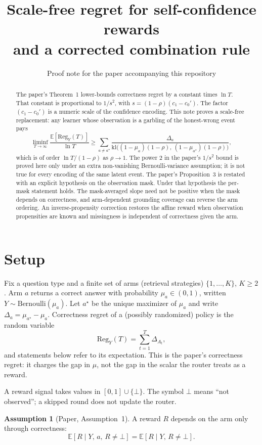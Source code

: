 \documentclass{article}
\title{Scale-free regret for self-confidence rewards\\
and a corrected combination rule}
\author{Proof note for the paper accompanying this repository}
\date{}
\theoremstyle{definition}
\newtheorem{assumption}[theorem]{Assumption}
\theoremstyle{remark}
\newcommand{\E}{\mathbb{E}}
\newcommand{\kl}{\mathrm{kl}}
\newcommand{\Reg}{\mathrm{Reg}}
\begin{document}
\maketitle

\begin{abstract}
The paper's Theorem~1 lower-bounds correctness regret by a constant times $\ln T$. That constant is proportional to $1/s^2$, with $s=(1-\rho)(c_1-c_0')$. The factor $(c_1-c_0')$ is a numeric scale of the confidence encoding. This note proves a scale-free replacement: any learner whose observation is a garbling of the honest-wrong event pays
\[
\liminf_{T\to\infty}\frac{\E[\Reg_Y(T)]}{\ln T}
\ge\sum_{a\neq a^\star}
\frac{\Delta_a}{\kl\!\big((1-\mu_a)(1-\rho),\,(1-\mu_{a^\star})(1-\rho)\big)},
\]
which is of order $\ln T/(1-\rho)$ as $\rho\to 1$. The power $2$ in the paper's $1/s^2$ bound is proved here only under an extra non-vanishing Bernoulli-variance assumption; it is not true for every encoding of the same latent event. The paper's Proposition~3 is restated with an explicit hypothesis on the observation mask. Under that hypothesis the per-mask statement holds. The mask-averaged slope need not be positive when the mask depends on correctness, and arm-dependent grounding coverage can reverse the arm ordering. An inverse-propensity correction restores the affine reward when observation propensities are known and missingness is independent of correctness given the arm.
\end{abstract}

\section{Setup}
Fix a question type and a finite set of arms (retrieval strategies) $\{1,\dots,K\}$, $K\ge 2$. Arm $a$ returns a correct answer with probability $\mu_a\in(0,1)$, written $Y\sim\mathrm{Bernoulli}(\mu_a)$. Let $a^\star$ be the unique maximizer of $\mu_a$ and write $\Delta_a=\mu_{a^\star}-\mu_a$. Correctness regret of a (possibly randomized) policy is the random variable
\[
\Reg_Y(T)=\sum_{t=1}^T\Delta_{A_t},
\]
and statements below refer to its expectation. This is the paper's correctness regret: it charges the gap in $\mu$, not the gap in the scalar the router treats as a reward.

A reward signal takes values in $[0,1]\cup\{\bot\}$. The symbol $\bot$ means ``not observed''; a skipped round does not update the router.

\begin{assumption}[Paper, Assumption~1]\label{ass:ci}
A reward $R$ depends on the arm only through correctness:
\[
\E[R\mid Y,\,a,\,R\neq\bot]=\E[R\mid Y,\,R\neq\bot].
\]
\end{assumption}
\end{document}

